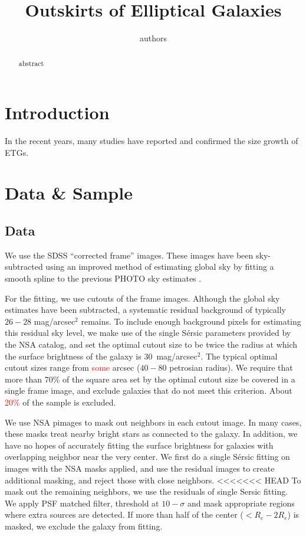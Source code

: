 \documentclass[iop]{emulateapj}
\newcommand{\Sersic}{S\'ersic}
\renewcommand{\Re}{\ensuremath{R_e}}
\newcommand\todo[1]{\textcolor{red}{#1}}
\begin{document}
\title{Outskirts of Elliptical Galaxies}
\author{authors}


\begin{abstract}
    abstract    
\end{abstract}    


\section{Introduction}

In the recent years, many studies have reported and confirmed the size growth
of ETGs.

\section{Data \& Sample}

\subsection{Data}
We use the SDSS ``corrected frame'' images. These images have been
sky-subtracted using an improved method of estimating global sky by fitting
a smooth spline to the previous PHOTO sky estimates
\citep[see][for details]{blanton2011}.

For the fitting, we use cutouts of the frame images.
Although the global sky estimates have been subtracted, a systematic residual
background of typically $26-28$ mag/arcsec$^2$ remains.
To include enough background pixels for estimating this residual sky level,
we make use of the single \Sersic{} parameters provided by the NSA catalog,
and set the optimal cutout size to be twice the radius at which the surface
brightness of the galaxy is 30~mag/arcsec$^2$.
The typical optimal cutout sizes range from
\todo{some} arcsec ($40-80$ petrosian radius).
We require that more than 70\% of the square area set by the optimal cutout
size be covered in a single frame image,
and exclude galaxies that do not meet this criterion.
About \todo{20\%} of the sample is excluded.

We use NSA pimages to mask out neighbors in each cutout image.
In many cases, these masks treat nearby bright stars as connected to the galaxy.
In addition, we have no hopes of accurately fitting the surface brightness
for galaxies with overlapping neighbor near the very center.
We first do a single \Sersic{} fitting on images with the NSA masks applied,
and use the residual images to create additional masking,
and reject those with close neighbors.
<<<<<<< HEAD
To mask out the remaining neighbors, we use the residuals of single Sersic
fitting.
We apply PSF matched filter, threshold at $10-\sigma$ and mask appropriate
regions where extra sources are detected.
If more than half of the center ($< \Re - 2\Re$) is masked, we exclude
the galaxy from fitting.
\end{document}
